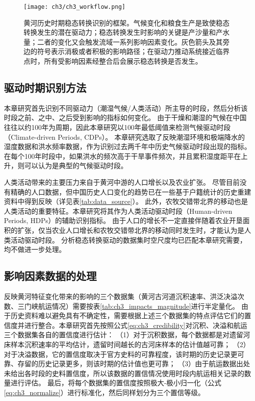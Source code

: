 \begin{figure}[htb] %
    \centering
    \texttt{[image: ch3/ch3\_workflow.png]}
    \caption[黄河历史时期稳态转换识别的框架]{黄河历史时期稳态转换识别的框架。气候变化和粮食生产是致使稳态转换发生的潜在驱动力；稳态转换发生时影响的关键是产沙量和产水量；二者的变化又会触发流域一系列影响因素变化。灰色箭头及其旁边的符号表示消极或者积极的影响路径；在驱动力推动系统接近临界点时，所有受影响因素经整合后会展示稳态转换是否发生。}\label{fig:ch3:regime_shift_detect}
\end{figure}

\subsection{驱动时期识别方法}

本章研究首先识别不同驱动力（潮湿气候/人类活动）所主导的时段，然后分析该时段之前、之中、之后受到影响的指标如何变化。
由于干燥和潮湿的气候在中国往往以约100年为周期\cite{GeQuanSheng2011}，因此本章研究以100年最低阈值来检测气候驱动时段（Climate-driven Periods, CDPs）。
本章研究选取了反映潮湿环境和极端降水的湿度数据和洪水频率数据，作为识别过去两千年中历史气候驱动时段出现的指标。
在每个100年时段中，如果洪水的频次高于干旱事件频次，并且累积湿度距平在上升，则可以认为是典型的气候驱动时段。

人类活动带来的主要压力来自于黄河中游的人口增长以及农业扩张。
尽管目前没有精确的人口数据，但中国历史人口变化的趋势已在一些基于户籍统计的历史重建资料中得到反映（详见表\ref{tab:data_source}）。
此外，农牧交错带北界的移动也是人类活动的重要特征。本章研究将其作为人类活动驱动时段（Human-driven Periods, HDPs）的辅助识别指标。
由于人口的增长不一定直接伴随着农业开垦面积的扩张，仅当农业人口增长和农牧交错带北界的移动同时发生时，才能认为是人类活动驱动时段。
分析稳态转换驱动的数据集时空尺度均已匹配本章研究需要，均不做进一步处理。

\subsection{影响因素数据的处理}

反映黄河特征变化带来的影响的三个数据集（黄河古河道沉积速率、洪泛决溢次数、三门峡航运情况）需要按表\ref{tab:ch3_impacts_magnitude}进行半定量化。
由于历史资料难以避免具有不确定性，需要根据上述三个数据集的特点评估它们的置信度并进行整合。本章研究首先按照公式\ref{eq:ch3_credibility}对沉积、决溢和航运三个数据集各自的置信度进行估计：
（1）对于沉积数据，每个数据都是对遗留河床样本沉积速率的平均估计，遗留时间越长的古河床样本的估计值越可靠；
（2）对于决溢数据，它的置信度取决于官方史料的可靠程度，该时期的历史记录更可靠、存留的历史记录更多，则该时期的估计值也更可靠；
（3）由于航运数据出处未给出各时段的史料置信度，所以该数据的置信情况使用时段内航运相关记录的数量进行评估。
最后，将每个数据集的置信度按照极大-极小归一化（公式\ref{eq:ch3_normalize}）进行标准化，然后同样划分为三个置信等级。

